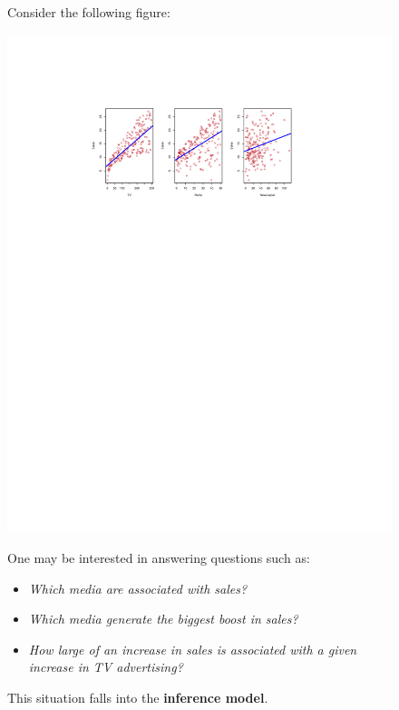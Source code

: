 \documentclass[a4paper]{article}
\begin{document}
    \begin{figure}[!htp]
        \begin{examplebox}
            Consider the following figure:
            \begin{center}
                \includegraphics[width=\textwidth]{img/statistical-learning-1.pdf}
            \end{center}
            One may be interested in answering questions such as:
            \begin{itemize}
                \item \emph{Which media are associated with sales?}
                \item \emph{Which media generate the biggest boost in sales?}
                \item \emph{How large of an increase in sales is associated with a given increase in TV advertising?}
            \end{itemize}
            This situation falls into the \textbf{inference model}.
        \end{examplebox}
    \end{figure}
\end{document}
